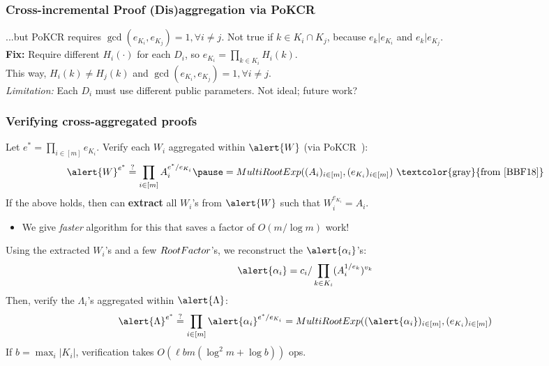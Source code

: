 \begin{frame}
    \frametitle{Cross-incremental Proof (Dis)aggregation via \alert{PoKCR}~\cite{BBF18}}
    ...but \alert{PoKCR} requires $\gcd(e_{K_i}, e_{K_j})= 1,\forall i\ne j$\pause. Not true if $k\in K_i \cap K_j$, because $e_k | e_{K_i}$ and $e_k | e_{K_j}$.\pause\\
    \vspace{1em}
    \textbf{Fix:} Require different $H_i(\cdot)$ for each $D_i$, so $e_{K_i} = \prod_{k\in K_i} H_i(k)$.\pause\\
    This way, $H_i(k) \ne H_j(k)$ and $\gcd(e_{K_i}, e_{K_j}) = 1,\forall i\ne j$.\pause\\
    \vspace{1em}
    \textit{Limitation:} Each $D_i$ must use different public parameters.\pause\xspace
    Not ideal; future work?
\end{frame}

\begin{frame}
    \frametitle{Verifying cross-aggregated proofs}
    Let $e^* = \prod_{i\in[m]} e_{K_i}$.\pause\xspace
    Verify each $W_i$ aggregated within $\alert{W}$ (via \alert{PoKCR}~\cite{BBF18})\pause:
    $$\alert{W}^{e^*} \stackrel{?}{=} \prod_{i\in [m]} A_i^{e^* / e_{K_i}}\pause = \multirootexp((A_i)_{i\in[m]}, (e_{K_i})_{i\in [m]})\ \text{\textcolor{gray}{from~\cite{BBF18}}}$$\pause\noindent
    If the above holds, then can \textbf{extract} all $W_i$'s from $\alert{W}$ such that $W_i^{e_{K_i}} = A_i$.\pause\xspace
    \begin{itemize}
        \item \footnotesize We give \textit{faster} algorithm for this that saves a factor of $O(m/\log{m})$ work!\pause
    \end{itemize}
    Using the extracted $W_i$'s and a few $\mathsf\boldmath{RootFactor}$'s, we reconstruct the $\alert{\alpha_i}$'s\pause:
    $$\alert{\alpha_i} = c_i / \prod_{k\in K_i} (A_i^{1/e_k})^{v_k}$$\pause
    Then, verify the $\Lambda_i$'s aggregated within $\alert{\Lambda}$:\pause
    $$\alert{\Lambda}^{e^*} \stackrel{?}{=} \prod_{i\in [m]} \alert{\alpha_i}^{e^*/e_{K_i}} = \multirootexp((\alert{\alpha_i})_{i\in[m]}, (e_{K_i})_{i\in [m]})$$\pause
    \noindent
    If $b=\max_i{|K_i|}$, verification takes $O(\ell b m (\log^2{m}+\log{b}))$ \Gho ops.
\end{frame}

